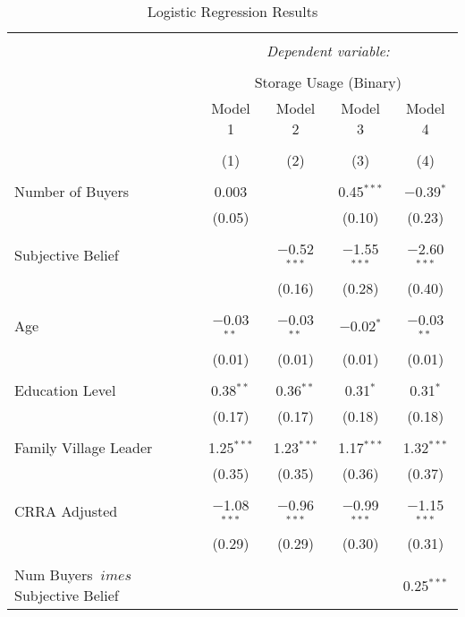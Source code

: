 
\begin{table}[!htbp] \centering 
  \caption{Logistic Regression Results} 
  \label{tab: binary storage ~ buyers' competition at harvest} 
\footnotesize 
\begin{tabular}{@{\extracolsep{5pt}}lcccc} 
\\[-1.8ex]\hline 
\hline \\[-1.8ex] 
 & \multicolumn{4}{c}{\textit{Dependent variable:}} \\ 
\cline{2-5} 
\\[-1.8ex] & \multicolumn{4}{c}{Storage Usage (Binary)} \\ 
 & Model 1 & Model 2 & Model 3 & Model 4 \\ 
\\[-1.8ex] & (1) & (2) & (3) & (4)\\ 
\hline \\[-1.8ex] 
 Number of Buyers & 0.003 &  & 0.45$^{***}$ & $-$0.39$^{*}$ \\ 
  & (0.05) &  & (0.10) & (0.23) \\ 
  & & & & \\ 
 Subjective Belief &  & $-$0.52$^{***}$ & $-$1.55$^{***}$ & $-$2.60$^{***}$ \\ 
  &  & (0.16) & (0.28) & (0.40) \\ 
  & & & & \\ 
 Age & $-$0.03$^{**}$ & $-$0.03$^{**}$ & $-$0.02$^{*}$ & $-$0.03$^{**}$ \\ 
  & (0.01) & (0.01) & (0.01) & (0.01) \\ 
  & & & & \\ 
 Education Level & 0.38$^{**}$ & 0.36$^{**}$ & 0.31$^{*}$ & 0.31$^{*}$ \\ 
  & (0.17) & (0.17) & (0.18) & (0.18) \\ 
  & & & & \\ 
 Family Village Leader & 1.25$^{***}$ & 1.23$^{***}$ & 1.17$^{***}$ & 1.32$^{***}$ \\ 
  & (0.35) & (0.35) & (0.36) & (0.37) \\ 
  & & & & \\ 
 CRRA Adjusted & $-$1.08$^{***}$ & $-$0.96$^{***}$ & $-$0.99$^{***}$ & $-$1.15$^{***}$ \\ 
  & (0.29) & (0.29) & (0.30) & (0.31) \\ 
  & & & & \\ 
 Num Buyers $\	imes$ Subjective Belief &  &  &  & 0.25$^{***}$ \\ 

\end{tabular}
\end{table}

